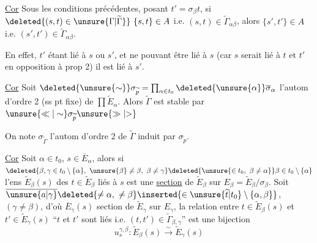 \noindent\vrule\hspace{.5em}\begin{minipage}{.89\linewidth}\uline{Cor} \quad {} Sous les conditions précédentes, posant $t'=\sigma_\beta t$, si  $\deleted{(s,t)\in\unsure{\Gamma|\widetilde\Gamma}}\ \{s,t\}\in A$ i.e. $(s,t)\in\widetilde\Gamma_{\alpha\beta}$, alors  $\{s',t'\}\in A$ i.e. $(s',t')\in\widetilde\Gamma_{\alpha\beta}$.

\end{minipage}

En effet, $t'$ étant lié à $s$ ou $s'$, et ne pouvant être lié à $s$ (car $s$ serait lié à $t$ et $t'$ en opposition à prop 2) il est lié à $s'$.

\noindent\vrule\hspace{.5em}\begin{minipage}{.89\linewidth}\uline{Cor} \quad Soit $\deleted{\unsure{\sim}}\sigma_{\widetilde p}=\prod_{\alpha\in t_0}\deleted{\unsure{\alpha}}\overline\sigma_\alpha$ l'autom  d'ordre 2 (ss pt fixe) de $\prod\widetilde E_\alpha$. Alors $\widetilde\Gamma$ est stable par $\unsure{\ll|\sim}\sigma_{\widetilde p}\unsure{\gg|{>}}$\end{minipage}

On note $\sigma_{\widetilde\Gamma}$ l'autom d'ordre 2 de $\widetilde\Gamma$ induit par $\sigma_{\widetilde p}$.

\uline{Cor} \quad Soit $\alpha\in t_0$, $s\in\overline E_\alpha$, alors si $\deleted{\beta,\gamma\in t_0\setminus\{\alpha\},\ \unsure{\beta}\ne\beta,\ \beta\ne\gamma}\deleted{\unsure{\in t_0,\ \beta\ne\alpha}}\beta\in t_0\setminus\{\alpha\}$ l'ens $\widetilde E_\beta(s)$  des $t\in\widetilde E_\beta$  liés à $s$ est une \uline{section} de $\widetilde E_\beta$ sur $E_\beta=\widetilde E_\beta/\sigma_\beta$. Soit  $\overline{\unsure{a|\gamma}}\deleted{\ne\alpha,\ \ne\beta}\inserted{\in\unsure{\widetilde t|t_0}\setminus\{\alpha,\beta\}}$, $(\gamma\ne\beta)$, d'où $\overline E_\gamma(s)$ section de $\widetilde E_\gamma$ sur $E_\gamma$, la relation entre $t\in\widetilde E_\beta(s)$ et $t'\in\widetilde E_\gamma(s)$ ``$t$ et $t'$ sont liés i.e. $(t,t')\in\widetilde\Gamma_{\beta,\gamma}$'' est une bijection 
\[
u_s^{\gamma,\beta}:\widetilde E_\beta(s)\xrightarrow{\sim}\widetilde E_\gamma(s)
\]

